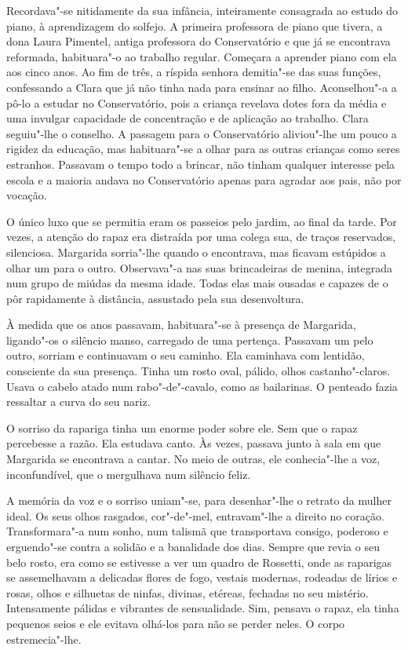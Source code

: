 Recordava"-se nitidamente da sua infância, inteiramente consagrada ao
estudo do piano, à aprendizagem do solfejo. A primeira professora de
piano que tivera, a dona Laura Pimentel, antiga professora do
Conservatório e que já se encontrava reformada, habituara"-o ao trabalho
regular. Começara a aprender piano com ela aos cinco anos. Ao fim de
três, a ríspida senhora demitia"-se das suas funções, confessando a Clara
que já não tinha nada para ensinar ao filho. Aconselhou"-a a pô-lo a
estudar no Conservatório, pois a criança revelava dotes fora da média e
uma invulgar capacidade de concentração e de aplicação ao trabalho.
Clara seguiu"-lhe o conselho. A passagem para o Conservatório aliviou"-lhe
um pouco a rigidez da educação, mas habituara"-se a olhar para as outras
crianças como seres estranhos. Passavam o tempo todo a brincar, não
tinham qualquer interesse pela escola e a maioria andava no
Conservatório apenas para agradar aos pais, não por vocação.

O único luxo que se permitia eram os passeios pelo jardim, ao final da
tarde. Por vezes, a atenção do rapaz era distraída por uma colega sua,
de traços reservados, silenciosa. Margarida sorria"-lhe quando o
encontrava, mas ficavam estúpidos a olhar um para o outro. Observava"-a
nas suas brincadeiras de menina, integrada num grupo de miúdas da mesma
idade. Todas elas mais ousadas e capazes de o pôr rapidamente à
distância, assustado pela sua desenvoltura.

À medida que os anos passavam, habituara"-se à presença de Margarida,
ligando"-os o silêncio manso, carregado de uma pertença. Passavam um pelo
outro, sorriam e continuavam o seu caminho. Ela caminhava com lentidão,
consciente da sua presença. Tinha um rosto oval, pálido, olhos
castanho"-claros. Usava o cabelo atado num rabo"-de"-cavalo, como as
bailarinas. O penteado fazia ressaltar a curva do seu nariz.

O sorriso da rapariga tinha um enorme poder sobre ele. Sem que o rapaz
percebesse a razão. Ela estudava canto. Às vezes, passava junto à sala
em que Margarida se encontrava a cantar. No meio de outras, ele
conhecia"-lhe a voz, inconfundível, que o mergulhava num silêncio feliz.

A memória da voz e o sorriso uniam"-se, para desenhar"-lhe o retrato da
mulher ideal. Os seus olhos rasgados, cor"-de"-mel, entravam"-lhe a direito
no coração. Transformara"-a num sonho, num talismã que transportava
consigo, poderoso e erguendo"-se contra a solidão e a banalidade dos
dias. Sempre que revia o seu belo rosto, era como se estivesse a ver um
quadro de Rossetti, onde as raparigas se assemelhavam a delicadas flores
de fogo, vestais modernas, rodeadas de lírios e rosas, olhos e silhuetas
de ninfas, divinas, etéreas, fechadas no seu mistério. Intensamente
pálidas e vibrantes de sensualidade. Sim, pensava o rapaz, ela tinha
pequenos seios e ele evitava olhá-los para não se perder neles. O corpo
estremecia"-lhe.

